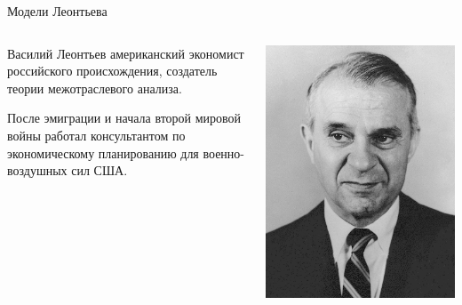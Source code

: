 \documentclass{beamer}
\begin{document}
\begin{frame}{Модели Леонтьева}
\begin{columns}
\begin{column}{0.5\textwidth}
   \alert{Василий Леонтьев} американский экономист российского происхождения, \alert{создатель теории межотраслевого анализа}. 
   
   \medskip
   
   После эмиграции и начала второй мировой войны работал консультантом по экономическому планированию для военно-воздушных сил США.
   
\end{column}
\begin{column}{0.5\textwidth}  %
    \begin{center}
     \includegraphics[width=1\textwidth]{leont}
     \end{center}
\end{column}
\end{columns}
\end{frame}
\end{document}

